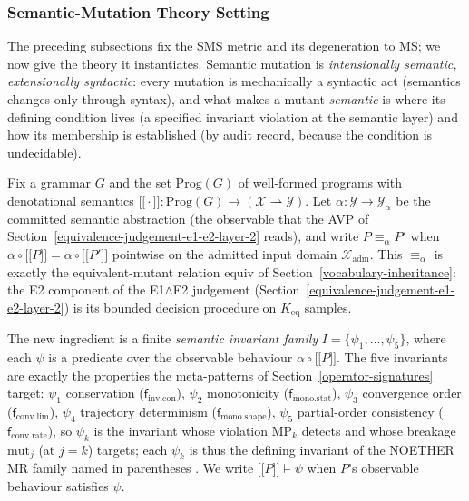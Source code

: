 \documentclass[manuscript,screen,review]{acmart}
\begin{document}

\subsubsection{Semantic-Mutation Theory Setting}\label{theory-setting}

The preceding subsections fix the SMS metric and its degeneration to MS; we now
give the theory it instantiates. Semantic mutation is \emph{intensionally
semantic, extensionally syntactic}: every mutation is mechanically a syntactic
act (semantics changes only through syntax), and what makes a mutant
\emph{semantic} is where its defining condition lives (a specified invariant
violation at the semantic layer) and how its membership is established (by
audit record, because the condition is undecidable).

Fix a grammar $G$ and the set $\mathrm{Prog}(G)$ of well-formed programs
with denotational semantics
$\mathopen{\lbrack\!\lbrack}\cdot\mathclose{\rbrack\!\rbrack} : \mathrm{Prog}(G) \to (\mathcal{X} \rightharpoonup \mathcal{Y})$.
Let $\alpha : \mathcal{Y} \to \mathcal{Y}_\alpha$ be the committed
semantic abstraction (the observable that the AVP of Section~\ref{equivalence-judgement-e1-e2-layer-2} reads), and
write $P \equiv_\alpha P'$ when
$\alpha \circ \mathopen{\lbrack\!\lbrack} P \mathclose{\rbrack\!\rbrack} = \alpha \circ \mathopen{\lbrack\!\lbrack} P' \mathclose{\rbrack\!\rbrack}$
pointwise on the admitted input domain $\mathcal{X}_{\mathrm{adm}}$.
This $\equiv_\alpha$ is exactly the equivalent-mutant relation
$\mathrm{equiv}$ of Section~\ref{vocabulary-inheritance}: the E2 component of the E1$\wedge$E2 judgement
(Section~\ref{equivalence-judgement-e1-e2-layer-2}) is its bounded decision procedure on $K_{\mathrm{eq}}$ samples.

The new ingredient is a finite \emph{semantic invariant family}
$I = \{\psi_1, \dots, \psi_5\}$, where each $\psi$ is a predicate over
the observable behaviour $\alpha \circ \mathopen{\lbrack\!\lbrack} P \mathclose{\rbrack\!\rbrack}$. The five
invariants are exactly the properties the meta-patterns of Section~\ref{operator-signatures} target:
$\psi_1$ conservation ($\mathsf{f}_{\mathrm{inv.con}}$), $\psi_2$ monotonicity
($\mathsf{f}_{\mathrm{mono.stat}}$), $\psi_3$ convergence order
($\mathsf{f}_{\mathrm{conv.lim}}$), $\psi_4$ trajectory determinism
($\mathsf{f}_{\mathrm{mono.shape}}$), $\psi_5$ partial-order
consistency ($\mathsf{f}_{\mathrm{conv.rate}}$), so
$\psi_k$ is the invariant whose violation MP$_k$ detects and whose
breakage $\mathrm{mut}_j$ (at $j=k$) targets; each $\psi_k$ is thus the
defining invariant of the NOETHER MR family named in parentheses
\citep{noether2026}. We write
$\mathopen{\lbrack\!\lbrack} P \mathclose{\rbrack\!\rbrack} \models \psi$ when $P$'s observable behaviour
satisfies $\psi$.
\end{document}
